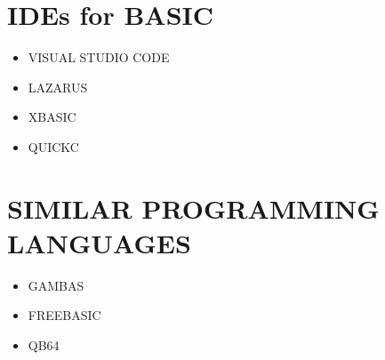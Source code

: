 \documentclass{article}
\begin{document}
	\section{IDEs for BASIC}
\begin{itemize}
	\item VISUAL STUDIO CODE
	\item LAZARUS
	\item XBASIC
	\item QUICKC
\end{itemize}
\section{SIMILAR PROGRAMMING LANGUAGES}
\begin{itemize}
	\item GAMBAS
	\item FREEBASIC
	\item QB64
\end{itemize}
\end{document}
